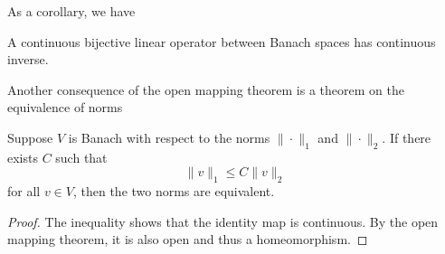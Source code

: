 \documentclass[twoside,symmetric, openany, 12pt]{./tuftebook}
\theoremstyle{definition}
\theoremstyle{definition}
\theoremstyle{definition}
\begin{document}
As a corollary, we have
\begin{Corollary}
	A continuous bijective linear operator between Banach spaces has continuous inverse.
\end{Corollary}
Another consequence of the open mapping theorem is a theorem on the equivalence of norms
\begin{Corollary}
	Suppose $V$ is Banach with respect to the norms $\|\cdot\|_1$ and $\|\cdot\|_2$. If there exists $C$ such that
	\[\|v\|_1 \le C \|v\|_2\]
	for all $v\in V$, then the two norms are equivalent.
\end{Corollary}
\begin{proof}
	The inequality shows that the identity map is continuous. By the open mapping theorem, it is also open and thus a homeomorphism.
\end{proof}
\end{document}

